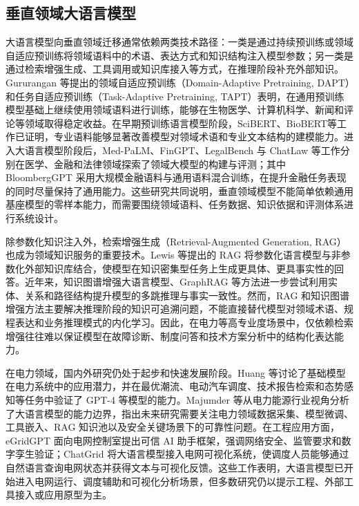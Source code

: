 \documentclass[fontset=fandol,type=master,campus=shenzhen,etitleauto=true]{hithesisbook}
\begin{document}
\subsection{垂直领域大语言模型}

大语言模型向垂直领域迁移通常依赖两类技术路径：一类是通过持续预训练或领域自适应预训练将领域语料中的术语、表达方式和知识结构注入模型参数；另一类是通过检索增强生成、工具调用或知识库接入等方式，在推理阶段补充外部知识。Gururangan 等提出的领域自适应预训练（Domain-Adaptive Pretraining, DAPT）和任务自适应预训练（Task-Adaptive Pretraining, TAPT）表明，在通用预训练模型基础上继续使用领域语料进行训练，能够在生物医学、计算机科学、新闻和评论等领域取得稳定收益\cite{ref6}。在早期预训练语言模型阶段，SciBERT\cite{ref7}、BioBERT\cite{ref8}等工作已证明，专业语料能够显著改善模型对领域术语和专业文本结构的建模能力。进入大语言模型阶段后，Med-PaLM\cite{ref9}、FinGPT\cite{ref11}、LegalBench 与 ChatLaw\cite{ref12,ref13} 等工作分别在医学、金融和法律领域探索了领域大模型的构建与评测；其中 BloombergGPT 采用大规模金融语料与通用语料混合训练，在提升金融任务表现的同时尽量保持了通用能力\cite{ref10}。这些研究共同说明，垂直领域模型不能简单依赖通用基座模型的零样本能力，而需要围绕领域语料、任务数据、知识依据和评测体系进行系统设计。

除参数化知识注入外，检索增强生成（Retrieval-Augmented Generation, RAG）也成为领域知识服务的重要技术。Lewis 等提出的 RAG 将参数化语言模型与非参数化外部知识库结合，使模型在知识密集型任务上生成更具体、更具事实性的回答\cite{ref14}。近年来，知识图谱增强大语言模型、GraphRAG 等方法进一步尝试利用实体、关系和路径结构提升模型的多跳推理与事实一致性\cite{ref15,ref16}。然而，RAG 和知识图谱增强方法主要解决推理阶段的知识可追溯问题，不能直接替代模型对领域术语、规程表达和业务推理模式的内化学习。因此，在电力等高专业度场景中，仅依赖检索增强往往难以保证模型在故障诊断、制度问答和技术方案分析中的结构化表达能力。

在电力领域，国内外研究仍处于起步和快速发展阶段。Huang 等讨论了基础模型在电力系统中的应用潜力，并在最优潮流、电动汽车调度、技术报告检索和态势感知等任务中验证了 GPT-4 等模型的能力\cite{ref17}。Majumder 等从电力能源行业视角分析了大语言模型的能力边界，指出未来研究需要关注电力领域数据采集、模型微调、工具嵌入、RAG 知识池以及安全关键场景下的可靠性问题\cite{ref4}。在工程应用方面，eGridGPT 面向电网控制室提出可信 AI 助手框架，强调网络安全、监管要求和数字孪生验证\cite{ref18}；ChatGrid 将大语言模型接入电网可视化系统，使调度人员能够通过自然语言查询电网状态并获得文本与可视化反馈\cite{ref19}。这些工作表明，大语言模型已开始进入电网运行、调度辅助和可视化分析场景，但多数研究仍以提示工程、外部工具接入或应用原型为主。
\end{document}
